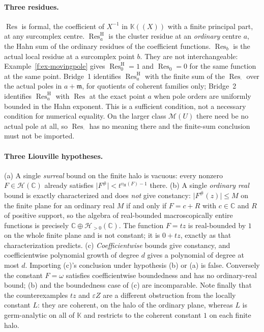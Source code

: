\documentclass[11pt,a4paper]{article}
\numberwithin{equation}{section}
\theoremstyle{definition}
\theoremstyle{remark}
\theoremstyle{plain}
\newcommand{\K}{\mathbb K}
\newcommand{\CC}{\mathbb C}
\newcommand{\mm}{\mathfrak m}
\newcommand{\ev}[1]{#1^{\#}}
\newcommand{\Hc}{\mathcal H}
\newcommand{\Mc}{\mathcal M}
\newcommand{\vH}{v_{\mathrm H}}
\DeclareMathOperator{\Res}{Res}                 %
\newcommand{\ResH}[1]{\Res^{\mathrm H}_{#1}}    %
\newcommand{\Resat}[1]{\Res_{#1}}               %
\newcommand{\abs}[1]{\lvert #1\rvert}
\begin{document}
\paragraph{Three residues.}
$\Res$ is formal, the coefficient of $X^{-1}$ in $\K((X))$ with a finite
principal part, at any surcomplex centre.  $\ResH a$ is the cluster
residue at an \emph{ordinary} centre $a$, the Hahn sum of the ordinary
residues of the coefficient functions.  $\Resat b$ is the actual local
residue at a surcomplex point $b$.  They are not interchangeable:
Example~\ref{f:ex-movingpole} gives $\ResH 0=1$ and $\Resat 0=0$ for the
same function at the same point.  Bridge~1 identifies $\ResH a$ with the
finite sum of the $\Resat{\cdot}$ over the actual poles in $a+\mm$, for
quotients of coherent families only; Bridge~2 identifies $\ResH a$ with
$\Res$ at the exact point $a$ when pole orders are uniformly
bounded in the Hahn exponent. This is a sufficient condition, not a
necessary condition for numerical equality.  On the larger class $\Mc(U)$ there need
be no actual pole at all, so $\Resat{\cdot}$ has no meaning there and
the finite-sum conclusion must not be imported.

\paragraph{Three Liouville hypotheses.}
(a) A single \emph{surreal} bound on the finite halo is vacuous: every
nonzero $F\in\Hc(\CC)$ already satisfies
$\abs{\ev F}<t^{\vH(F)-1}$ there.  (b) A single \emph{ordinary real}
bound is exactly characterized and does \emph{not} give constancy:
$\abs{\ev F(z)}\le M$ on the finite plane for an ordinary real $M$ if
and only if $F=c+R$ with $c\in\CC$ and $R$ of positive support, so the
algebra of real-bounded macroscopically entire functions is precisely
$\CC\oplus\Hc_{>0}(\CC)$.  The function $F=tz$ is real-bounded by $1$ on
the whole finite plane and is not constant; it is $0+tz$, exactly as
that characterization predicts.  (c) \emph{Coefficientwise} bounds give
constancy, and coefficientwise polynomial growth of degree $d$ gives a
polynomial of degree at most $d$.  Importing (c)'s conclusion under
hypothesis (b) or (a) is false. Conversely the constant $F=\omega$
satisfies coefficientwise boundedness and has no ordinary-real bound;
(b) and the boundedness case of (c) are incomparable. Note finally that the counterexamples
$tz$ and $\varepsilon Z$ are a different obstruction from the locally
constant $L$: they are coherent, on the halo of the ordinary plane,
whereas $L$ is germ-analytic on all of $\K$ and restricts to the
coherent constant $1$ on each finite halo.
\end{document}
